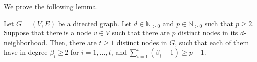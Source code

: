\ifnum{}
\noindent We prove the following lemma.
\fi
\begin{lemma}\label{lem:neigh}
    Let $G=(V,E)$ be a directed graph. Let $d\in \mathbb{N}_{>0}$ and $p\in \mathbb{N}_{>0}$ such that $p\geq 2$. Suppose that there is a node $v\in V$ such that there are $p$ distinct nodes in its $d$-neighborhood. 
    Then, there are  $t\ge 1$ distinct nodes in $G$, such that each of them have in-degree $\beta_i\geq 2$ for $i=1,\ldots,t$, and $\sum_{i=1}^t(\beta_i-1)\geq p-1$. 
\end{lemma}
\newcommand{\prooflemneigh}{
\begin{proof}




\end{proof}}
